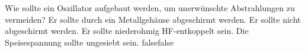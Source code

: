    {Wie sollte ein Oszillator aufgebaut werden, um unerwünschte Abstrahlungen zu vermeiden?}
    {Er sollte durch ein Metallgehäuse abgeschirmt werden.}
    {Er sollte nicht abgeschirmt werden.}
    {Er sollte niederohmig HF-entkoppelt sein.}
    {Die Speisespannung sollte ungesiebt sein. }
    {false}{false}